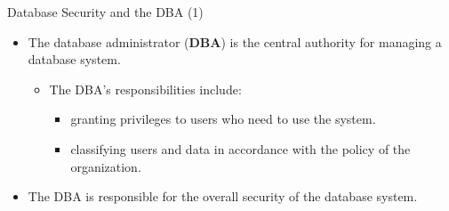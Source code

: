 \begin{frame}{Database Security and the DBA (1)}
    \Large
    
    \begin{itemize}
        \vspace{-1.5cm}
        
        \item The database administrator (\textbf{DBA}) is the central authority for managing a database system.
        
        \begin{itemize}
            \large
            \setlength{\itemsep}{0.2cm}
            
            \item The DBA's responsibilities include:
            
            \begin{itemize}
                \normalsize
                \setlength{\itemsep}{0.1cm}
                
                \item granting privileges to users who need to use the system.
                \item classifying users and data in accordance with the policy of the organization.
            \end{itemize}
        \end{itemize}
        
        \vspace{0.4cm}
        
        \item The DBA is responsible for the overall security of the database system.
        
    \end{itemize}
\end{frame}


